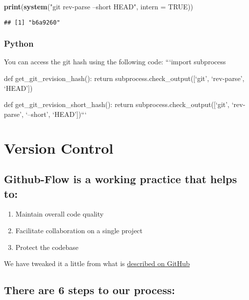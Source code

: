 \documentclass[]{book}
\newenvironment{Shaded}{\begin{snugshade}}{\end{snugshade}}
\newcommand{\DataTypeTok}[1]{\textcolor[rgb]{0.13,0.29,0.53}{#1}}
\newcommand{\KeywordTok}[1]{\textcolor[rgb]{0.13,0.29,0.53}{\textbf{#1}}}
\newcommand{\NormalTok}[1]{#1}
\newcommand{\OtherTok}[1]{\textcolor[rgb]{0.56,0.35,0.01}{#1}}
\newcommand{\StringTok}[1]{\textcolor[rgb]{0.31,0.60,0.02}{#1}}
\providecommand{\tightlist}{%
  \setlength{\itemsep}{0pt}\setlength{\parskip}{0pt}}
\begin{document}
\begin{Shaded}
\begin{Highlighting}[]
\KeywordTok{print}\NormalTok{(}\KeywordTok{system}\NormalTok{(}\StringTok{"git rev-parse --short HEAD"}\NormalTok{, }\DataTypeTok{intern =} \OtherTok{TRUE}\NormalTok{))}
\end{Highlighting}
\end{Shaded}

\begin{verbatim}
## [1] "b6a9260"
\end{verbatim}

\hypertarget{python}{%
\subsubsection{Python}\label{python}}

You can access the git hash using the following code:
```import subprocess

def get\_git\_revision\_hash():
return subprocess.check\_output({[}`git', `rev-parse', `HEAD'{]})

def get\_git\_revision\_short\_hash():
return subprocess.check\_output({[}`git', `rev-parse', `--short', `HEAD'{]})```

\hypertarget{versioncontrol}{%
\section{Version Control}\label{versioncontrol}}

\hypertarget{github-flow-is-a-working-practice-that-helps-to}{%
\subsection{Github-Flow is a working practice that helps to:}\label{github-flow-is-a-working-practice-that-helps-to}}

\begin{enumerate}
\def\labelenumi{\arabic{enumi}.}
\tightlist
\item
  Maintain overall code quality
\item
  Facilitate collaboration on a single project
\item
  Protect the codebase
\end{enumerate}

We have tweaked it a little from what is \href{https://guides.github.com/introduction/flow/}{described on GitHub}

\hypertarget{there-are-6-steps-to-our-process}{%
\subsection{There are 6 steps to our process:}\label{there-are-6-steps-to-our-process}}
\end{document}
